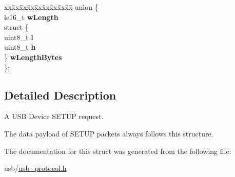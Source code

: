 \begin{DoxyCompactItemize}
\begin{tabbing}
\end{tabbing}\item 
\mbox{\label{structusb__req_a1aee9b648767efc36ceaf7aaba0f0b03}} 
\begin{tabbing}
xx\=xx\=xx\=xx\=xx\=xx\=xx\=xx\=xx\=\kill
union \{\\
\>le16\_t {\bfseries wLength}\\
\>struct \{\\
\>\>uint8\_t {\bfseries l}\\
\>\>uint8\_t {\bfseries h}\\
\>\} {\bfseries wLengthBytes}\\
\}; \\

\end{tabbing}\end{DoxyCompactItemize}


\subsection{Detailed Description}
A U\+SB Device S\+E\+T\+UP request. 

The data payload of S\+E\+T\+UP packets always follows this structure. 

The documentation for this struct was generated from the following file\+:\begin{DoxyCompactItemize}
\item 
usb/\hyperlink{usb__protocol_8h}{usb\+\_\+protocol.\+h}\end{DoxyCompactItemize}
